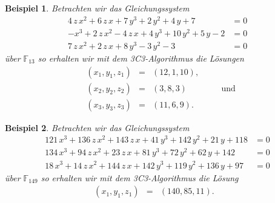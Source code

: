 \documentclass[a4paper,oneside, 11pt, openany%
]{article}
\newcommand{\F}[1]{\mathbb{F}_{#1}}
\theoremstyle{custom}
\theoremstyle{custom}
\newtheorem{example}{Beispiel}[section]
\begin{document}
\begin{example}
	Betrachten wir das Gleichungssystem
	\begin{equation}
		\begin{alignedat}{1}
			4\,z\,x^2+6\,z\,x+7\,y^3+2\,y^2+4\,y+7&=0\\ -x^3+2\,z\,x^2-4\,z\,x+4\,y^3+10\,y^2+5\,y-2&=0\\ 7\,z\,x^2+2\,z\,x+8\,y^3-3\,y^2-3&=0
		\end{alignedat}
	\end{equation}
	über $\F{13}$ so erhalten wir mit dem 3C3-Algorithmus die Lösungen
	\begin{equation*}
	\begin{alignedat}{5}
		&\left( x_{1},y_{1},z_{1}\right) &=& \left(12,1,10 \right),&&\\
		&\left( x_{2},y_{2},z_{2}\right) &=& \left(3,8,3 \right)&& \quad\text{und} \\
		&\left( x_{3},y_{3},z_{3}\right) &=& \left(11,6,9 \right).&&
	\end{alignedat}
\end{equation*}
\end{example}
\begin{example}
	Betrachten wir das Gleichungssystem
	\begin{equation}
		\begin{alignedat}{1}
			121\,x^3+136\,z\,x^2+143\,z\,x+41\,y^3+142\,y^2+21\,y+118&=0\\ 134\,x^3+94\,z\,x^2+23\,z\,x+81\,y^3+72\,y^2+62\,y+142&=0\\ 18\,x^3+14\,z\,x^2+144\,z\,x+142\,y^3+119\,y^2+136\,y+97&=0
		\end{alignedat}
	\end{equation}
	über $\F{149}$ so erhalten wir mit dem 3C3-Algorithmus die Lösung
	\begin{equation*}
		\begin{alignedat}{5}
			&\left( x_{1},y_{1},z_{1}\right) &=& \left(140,85,11 \right).&&
		\end{alignedat}
	\end{equation*}
\end{example}
\end{document}
